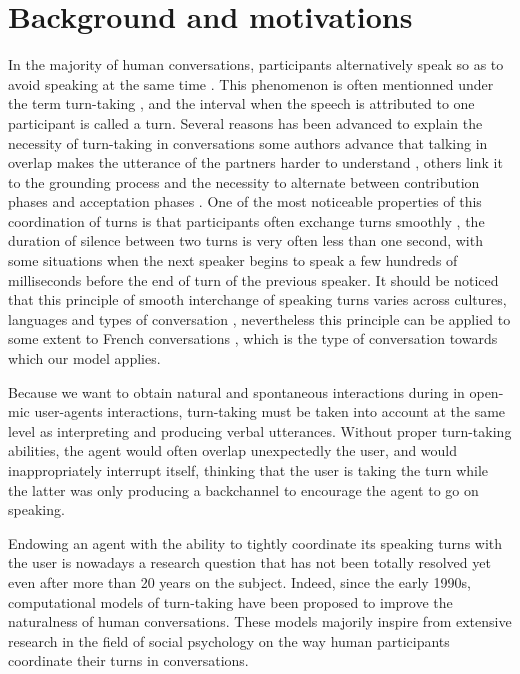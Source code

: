 \section{Background and motivations}
\label{backgd}

In the majority of human conversations, participants alternatively speak so as to avoid speaking at the same time \citep{sacks_simplest_1974}. This phenomenon is often mentionned under the term turn-taking \citep{sacks_simplest_1974}, and the interval when the speech is attributed to one participant is called a turn. Several reasons has been advanced to explain the necessity of turn-taking in conversations some authors advance that talking in overlap makes the utterance of the partners harder to understand \citep{duncan_signals_1972}, others link it to the grounding process and the necessity to alternate between contribution phases and acceptation phases \citep{clark_using_1996}. One of the most noticeable properties of this coordination of turns is that participants often exchange turns smoothly \citep{heldner_pauses_2010}, the duration of silence between two turns is very often less than one second, with some situations when the next speaker begins to speak a few hundreds of milliseconds before the end of turn of the previous speaker. It should be noticed that this principle of smooth interchange of speaking turns varies across cultures, languages and types of conversation \citep{oconnell_turntaking_2008,stivers_universals_2009}, nevertheless this principle can be applied to some extent to French conversations \citep{mondada_multimodal_2007}, which is the type of conversation towards which our model applies.

Because we want to obtain natural and spontaneous interactions during in open-mic user-agents interactions, turn-taking must be taken into account at the same level as interpreting and producing verbal utterances. 
Without proper turn-taking abilities, the agent would often overlap unexpectedly the user, and would inappropriately interrupt itself, thinking that the user is taking the turn while the latter was only producing a backchannel to encourage the agent to go on speaking. 

Endowing an agent with the ability to tightly coordinate its speaking turns with the user is nowadays a research question that has not been totally resolved yet even after more than 20 years on the subject. Indeed, since the early 1990s, computational models of turn-taking have been proposed to improve the naturalness of human conversations.
These models majorily inspire from extensive research in the field of social psychology on the way human participants coordinate their turns in conversations. 

